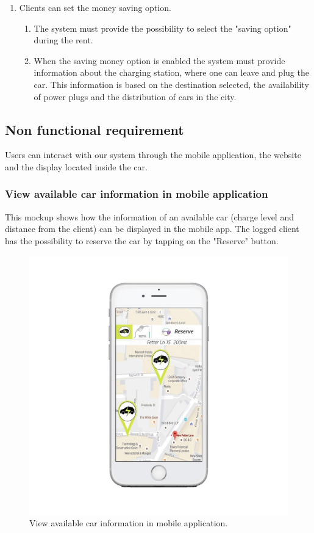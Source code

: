 \begin{enumerate}
\item Clients can set the money saving option.
\begin{enumerate}
\item The system must provide the possibility to select the "saving option" during the rent.
\item When the saving money option is enabled the system must provide information about the charging station, where one can leave and plug the car. This information is based on the destination selected, the availability of power plugs and the distribution of cars in the city.
\end{enumerate}
\end{enumerate}

\newpage
\subsection{Non functional requirement}
Users can interact with our system through the mobile application, the website and the display located inside the car.

\subsubsection{View available car information in mobile application} This mockup shows how the information of an available car (charge level and distance from the client) can be displayed in the mobile app. The logged client has the possibility to reserve the car by tapping on the "Reserve" button.
\begin{figure}[hp]
\centering
\includegraphics[width=470 pt]{resources/editato.jpg}
\caption{\label{fig:editato}View available car information in mobile application.}
\end{figure}

